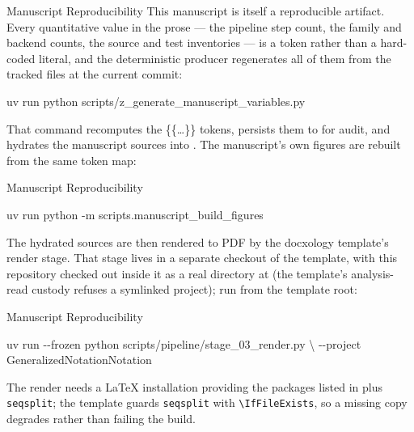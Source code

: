 \documentclass[
  ignorenonframetext,
]{beamer}
\newenvironment{Shaded}{}{}
\newcommand{\AttributeTok}[1]{\textcolor[rgb]{0.49,0.56,0.16}{#1}}
\newcommand{\DataTypeTok}[1]{\textcolor[rgb]{0.56,0.13,0.00}{#1}}
\newcommand{\ExtensionTok}[1]{#1}
\newcommand{\NormalTok}[1]{#1}
\begin{document}
\begin{frame}{Manuscript Reproducibility}
\protect{}\label{manuscript-reproducibility}
This manuscript is itself a reproducible artifact. Every quantitative
value in the prose --- the pipeline step count, the family and backend
counts, the source and test inventories --- is a token rather than a
hard-coded literal, and the deterministic producer regenerates all of
them from the tracked files at the current commit:

\begin{Shaded}
\begin{Highlighting}[]
\ExtensionTok{uv}\NormalTok{ run python scripts/z\_generate\_manuscript\_variables.py}
\end{Highlighting}
\end{Shaded}

That command recomputes the \{\{\ldots\}\} tokens, persists them to
 for audit, and hydrates
the manuscript sources into . The
manuscript's own figures are rebuilt from the same token map:

\end{frame}

\begin{frame}{Manuscript Reproducibility}
\begin{Shaded}
\begin{Highlighting}[]
\ExtensionTok{uv}\NormalTok{ run python }\AttributeTok{{-}m}\NormalTok{ scripts.manuscript\_build\_figures}
\end{Highlighting}
\end{Shaded}

The hydrated sources are then rendered to PDF by the docxology
template's render stage. That stage lives in a separate checkout of the
template, with this repository checked out inside it as a real directory
at  (the template's
analysis-read custody refuses a symlinked project); run from the
template root:

\end{frame}

\begin{frame}{Manuscript Reproducibility}
\begin{Shaded}
\begin{Highlighting}[]
\ExtensionTok{uv}\NormalTok{ run }\AttributeTok{{-}{-}frozen}\NormalTok{ python scripts/pipeline/stage\_03\_render.py }\DataTypeTok{\textbackslash{}}
  \AttributeTok{{-}{-}project}\NormalTok{ GeneralizedNotationNotation}
\end{Highlighting}
\end{Shaded}

The render needs a LaTeX installation providing the packages listed in
 plus \texttt{seqsplit}; the template
guards \texttt{seqsplit} with \texttt{\textbackslash{}IfFileExists}, so
a missing copy degrades rather than failing the build.

\end{frame}
\end{document}
